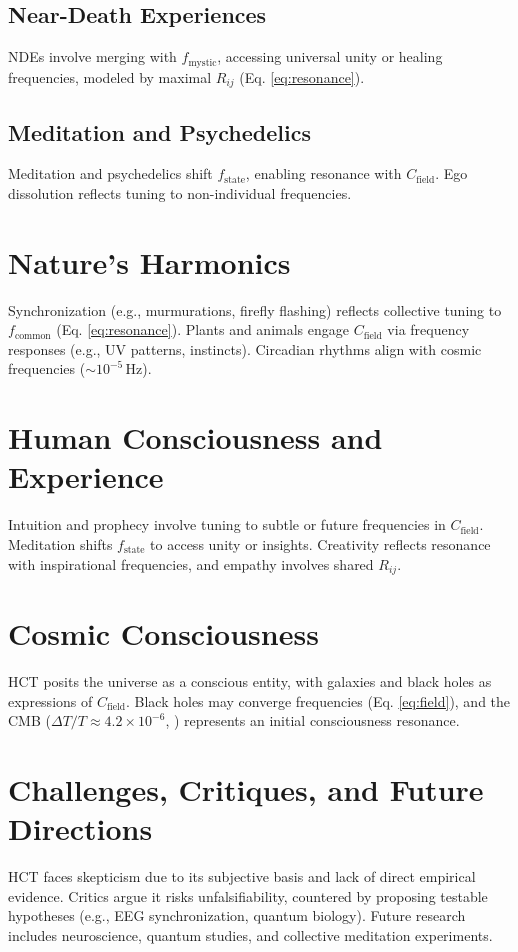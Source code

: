 \documentclass[a4paper,12pt]{article}
\begin{document}
\subsection{Near-Death Experiences}
NDEs involve merging with $f_{\text{mystic}}$, accessing universal unity or healing frequencies, modeled by maximal $R_{ij}$ (Eq. \ref{eq:resonance}).

\subsection{Meditation and Psychedelics}
Meditation and psychedelics shift $f_{\text{state}}$, enabling resonance with $C_{\text{field}}$. Ego dissolution reflects tuning to non-individual frequencies.

\section{Nature’s Harmonics}
\label{sec:nature}
Synchronization (e.g., murmurations, firefly flashing) reflects collective tuning to $f_{\text{common}}$ (Eq. \ref{eq:resonance}). Plants and animals engage $C_{\text{field}}$ via frequency responses (e.g., UV patterns, instincts). Circadian rhythms align with cosmic frequencies ($\sim 10^{-5} \, \text{Hz}$).

\section{Human Consciousness and Experience}
\label{sec:human_exp}
Intuition and prophecy involve tuning to subtle or future frequencies in $C_{\text{field}}$. Meditation shifts $f_{\text{state}}$ to access unity or insights. Creativity reflects resonance with inspirational frequencies, and empathy involves shared $R_{ij}$.

\section{Cosmic Consciousness}
\label{sec:cosmic}
HCT posits the universe as a conscious entity, with galaxies and black holes as expressions of $C_{\text{field}}$. Black holes may converge frequencies (Eq. \ref{eq:field}), and the CMB ($\Delta T / T \approx 4.2 \times 10^{-6}$, \cite{Planck2018}) represents an initial consciousness resonance.

\section{Challenges, Critiques, and Future Directions}
\label{sec:challenges}
HCT faces skepticism due to its subjective basis and lack of direct empirical evidence. Critics argue it risks unfalsifiability, countered by proposing testable hypotheses (e.g., EEG synchronization, quantum biology). Future research includes neuroscience, quantum studies, and collective meditation experiments.
\end{document}
